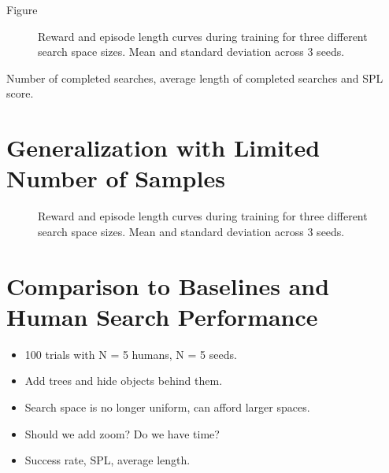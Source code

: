 Figure 


\begin{figure}
    \centering
    \label{fig:train-shape}
    \caption[Search space size learning curve.]{Reward and episode length curves during training for three different search space sizes. Mean and standard deviation across 3 seeds.}
\end{figure}

\begin{table}
    \caption[Search space performance metrics.]{Number of completed searches, average length of completed searches and SPL score.}
    \centering
    \label{tab:test-shape}
\end{table}

\section{Generalization with Limited Number of Samples}

\begin{figure}
    \centering
    \label{fig:samples}
    \caption[Generalization results.]{Reward and episode length curves during training for three different search space sizes. Mean and standard deviation across 3 seeds.}
\end{figure}


\section{Comparison to Baselines and Human Search Performance}

\begin{itemize}
    \item 100 trials with N = 5 humans, N = 5 seeds.
    \item Add trees and hide objects behind them.
    \item Search space is no longer uniform, can afford larger spaces.
    \item Should we add zoom? Do we have time?
    \item Success rate, SPL, average length.
\end{itemize}